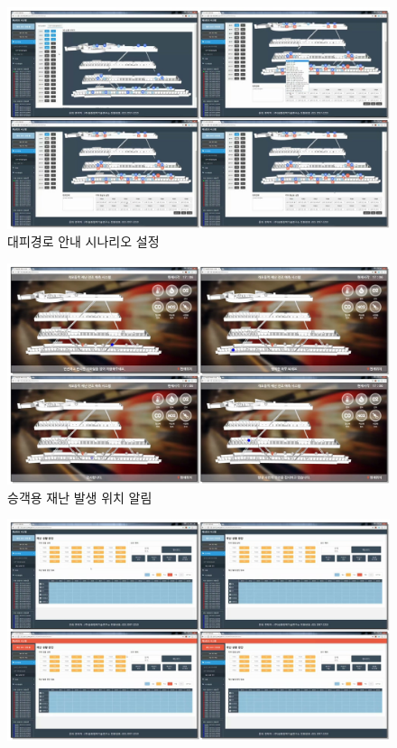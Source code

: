 \documentclass[10pt,a4paper,ragged2e]{altacv}
\begin{document}
\begin{fullwidth}
\begin{itemize}
\begin{itemize}
\begin{figure}[ht!]
\begin{fullwidth}
					            \centering
					            \includegraphics[width=1.2\textwidth]{images/m2m_03.png}
					            \caption*{대피경로 안내 시나리오 설정}
				            \end{fullwidth}
			            \end{figure}
			            \begin{figure}[ht!]
				            \begin{fullwidth}
					            \centering
					            \includegraphics[width=1.2\textwidth]{images/m2m_04.png}
					            \caption*{승객용 재난 발생 위치 알림}
				            \end{fullwidth}
			            \end{figure}
			            \begin{figure}[ht!]
				            \begin{fullwidth}
					            \centering
					            \includegraphics[width=1.2\textwidth]{images/m2m_05.png}

\end{fullwidth}
\end{figure}
\end{itemize}
\end{itemize}
\end{fullwidth}
\end{document}
